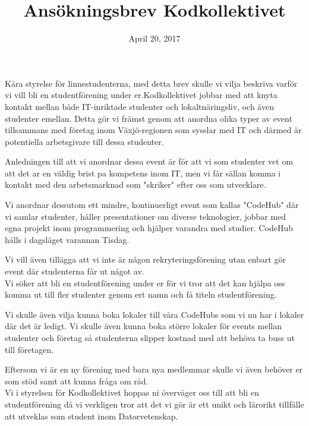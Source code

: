 \documentclass[a4paper,11pt]{article}
\begin{document}
	

\title{Ansökningsbrev Kodkollektivet}
\date{April 20, 2017}
\maketitle

\noindent Kära styrelse för linnestudenterna, med detta brev skulle vi vilja beskriva varför vi vill bli en studentförening under er.Kodkollektivet jobbar med att knyta kontakt mellan både IT-inriktade studenter och lokaltnäringsliv, och även studenter emellan. Detta gör vi främst genom att anordna olika typer av event tillsammans med företag inom Växjö-regionen som sysslar med IT och därmed är potentiella arbetsgivare 
till dessa studenter.

Anledningen till att vi anordnar dessa event är för att vi som studenter vet om att det ar en väldig brist pa kompetens inom IT, men vi får sällan komma i kontakt med den arbetsmarknad som "skriker" efter oss som utvecklare.

Vi anordnar dessutom ett mindre, kontinuerligt event som kallas "CodeHub" där vi samlar studenter, håller presentationer om diverse teknologier, jobbar med egna projekt inom programmering och hjälper varandra med studier. CodeHub hålls i dagsläget varannan Tisdag.

Vi vill även tillägga att vi inte är någon rekryteringsförening utan enbart gör event där studenterna får ut något av.
\\

\noindent Vi söker att bli en studentförening under er för vi tror att det kan hjälpa oss komma ut till fler studenter genom ert namn och få titeln studentförening.

Vi skulle även vilja kunna boka lokaler till våra CodeHubs som vi nu har i lokaler där det är ledigt. Vi skulle även kunna boka större lokaler för events mellan studenter och företag så studenterna slipper kostnad med att behöva ta buss ut till företagen. 

Eftersom vi är en ny förening med bara nya medlemmar skulle vi även behöver er som stöd samt att kunna fråga om råd.  
\\

\noindent Vi i styrelsen för Kodkollektivet hoppas ni överväger oss till att bli en studentförening då vi verkligen tror att det vi gör är ett unikt och lärorikt tillfälle att utveklas som student inom Datorvetenskap. \\[2cm]

\end{document}
